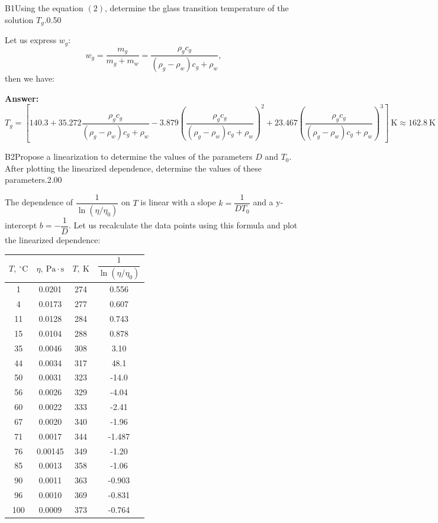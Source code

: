 \documentclass[11pt,a4paper]{article}
\begin{document}
\begin{solcard}{B1}{Using the equation $(2)$, determine the glass transition temperature of the solution $T_g$.}{0.50}

Let us express $w_g$: \[w_g=\dfrac{m_g}{m_g+m_w}=\dfrac{\rho_gc_g}{(\rho_g-\rho_w)c_g+\rho_w},\] then we have:

\par\smallskip\noindent\textbf{Answer:} 
\[T_g=\left[140.3+35.272\dfrac{\rho_gc_g}{(\rho_g-\rho_w)c_g+\rho_w}-3.879\left(\dfrac{\rho_gc_g}{(\rho_g-\rho_w)c_g+\rho_w}\right)^2+23.467\left(\dfrac{\rho_gc_g}{(\rho_g-\rho_w)c_g+\rho_w}\right)^3\right]~\mathrm{K}\approx 162.8~\mathrm{K}\]
\end{solcard}

\begin{solcard}{B2}{Propose a linearization to determine the values of the parameters $D$ and $T_0$. After plotting the linearized dependence, determine the values of these parameters.}{2.00}

The dependence of $\dfrac{1}{\ln(\eta/\eta_0)}$ on $T$ is linear with a slope $k=\dfrac{1}{DT_0}$ and a y-intercept $b=-\dfrac{1}{D}$. Let us recalculate the data points using this formula and plot the linearized dependence:

\begin{table}[H]
\centering
\begin{tabular}{|c|c|c|c|}
\hline
$T,~^\circ \mathrm{C}$ & $\eta,~\mathrm{Pa}\cdot\mathrm{s}$ & $T,~\mathrm{K}$ & $\dfrac{1}{\ln(\eta/\eta_0)}$ \\
\hline
1 & 0.0201 & 274 & 0.556 \\
4 & 0.0173 & 277 & 0.607 \\
11 & 0.0128 & 284 & 0.743 \\
15 & 0.0104 & 288 & 0.878 \\
35 & 0.0046 & 308 & 3.10 \\
44 & 0.0034 & 317 & 48.1 \\
50 & 0.0031 & 323 & -14.0 \\
56 & 0.0026 & 329 & -4.04 \\
60 & 0.0022 & 333 & -2.41 \\
67 & 0.0020 & 340 & -1.96 \\
71 & 0.0017 & 344 & -1.487 \\
76 & 0.00145 & 349 & -1.20 \\
85 & 0.0013 & 358 & -1.06 \\
90 & 0.0011 & 363 & -0.903 \\
96 & 0.0010 & 369 & -0.831 \\
100 & 0.0009 & 373 & -0.764 \\
\hline
\end{tabular}
\end{table}


\end{solcard}
\end{document}

